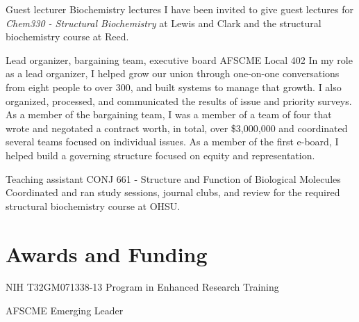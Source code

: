 \documentclass{prometheus_cv}
\begin{document}
{Guest lecturer}
{Biochemistry lectures}
{%
	I have been invited to give guest lectures for \textit{Chem330 - Structural Biochemistry} at Lewis and Clark and the structural biochemistry course at Reed.}

{Lead organizer, bargaining team, executive board}
{AFSCME Local 402}
{%
	In my role as a lead organizer, I helped grow our union through one-on-one conversations from eight people to over 300, and built systems to manage that growth. I also organized, processed, and communicated the results of issue and priority surveys. As a member of the bargaining team, I was a member of a team of four that wrote and negotated a contract worth, in total, over \$3,000,000 and coordinated several teams focused on individual issues. As a member of the first e-board, I helped build a governing structure focused on equity and representation.}

{Teaching assistant}
{CONJ 661 - Structure and Function of Biological Molecules}
{%
	Coordinated and ran study sessions, journal clubs, and review for the required structural biochemistry course at OHSU.}

\section{Awards and Funding}
{%
	NIH T32GM071338-13}
{%
	Program in Enhanced Research Training}
{}

{%
	AFSCME}
{%
	Emerging Leader}
{}
\end{document}
